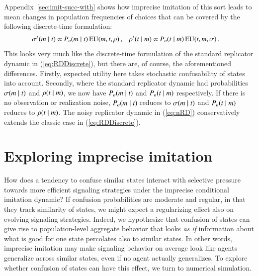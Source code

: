 \documentclass[fleqn,reqno,10pt]{article}
\begin{document}
Appendix~\ref{sec:imit-succ-with} shows how imprecise imitation of this sort leads to mean changes in population
frequencies of choices that can be covered by the following discrete-time formulation:
\begin{align}
  \label{eq:nRD}
  \sigma'(m \mid t) & \propto P_o(m \mid t) \thinspace \mathrm{EU}(m,
  t, \rho)\,, & \rho'(t \mid m) & \propto P_o(t \mid m)
  \thinspace \mathrm{EU}(t, m, \sigma)\,.
\end{align}
\noindent This looks very much like the discrete-time formulation of the standard replicator
dynamic in (\ref{eq:RDDiscrete}), but there are, of course, the aforementioned
differences. Firstly, expected utility here takes stochastic confusability of states into
account. Secondly, where the standard replicator dynamic had probabilities
$\sigma(m \mid t)$ and $\rho(t \mid m)$, we now have
$P_o(m \mid t)$ and $P_o(t \mid m)$ respectively. If there is no
observation or realization noise, $P_o(m \mid t)$ reduces to
$\sigma(m \mid t)$ and $P_o(t \mid m)$ reduces to
$\rho(t \mid m)$. The noisy replicator dynamic in (\ref{eq:nRD})
conservatively extends the classic case in (\ref{eq:RDDiscrete}).







\section{Exploring imprecise imitation}
\label{sec:exploring-rdd}

How does a tendency to confuse similar states interact with selective pressure towards more
efficient signaling strategies under the imprecise conditional imitation dynamic? If confusion
probabilities are moderate and regular, in that they track similarity of states, we might
expect a regularizing effect also on evolving signaling strategies. Indeed, we hypothesize that
confusion of states can give rise to population-level aggregate behavior that looks \emph{as
  if} information about what is good for one state percolates also to similar states. In other
words, imprecise imitation may make signaling behavior on average look like agents generalize
across similar states, even if no agent actually generalizes. To explore whether confusion of
states can have this effect, we turn to numerical simulation.
\end{document}
